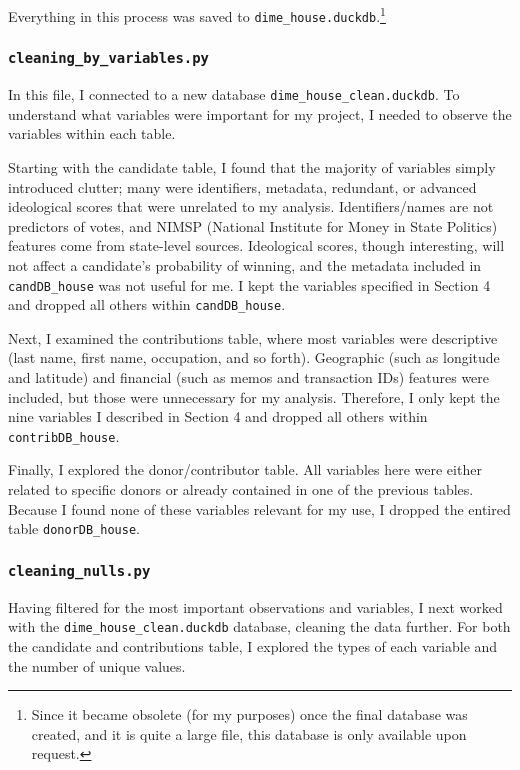Everything in this process was saved to {\tt dime\_house.duckdb}.\footnote{Since it became obsolete (for my purposes) once the final database was created, and it is quite a large file, this database is only available upon request.}

\subsubsection*{\tt cleaning\_by\_variables.py}

In this file, I connected to a new database {\tt dime\_house\_clean.duckdb}. To understand what variables were important for my project, I needed to observe the variables within each table.

Starting with the candidate table, I found that the majority of variables simply introduced clutter; many were identifiers, metadata, redundant, or advanced ideological scores that were unrelated to my analysis. Identifiers/names are not predictors of votes, and NIMSP (National Institute for Money in State Politics) features come from state-level sources. Ideological scores, though interesting, will not affect a candidate's probability of winning, and the metadata included in {\tt candDB\_house} was not useful for me. I kept the variables specified in Section 4 and dropped all others within {\tt candDB\_house}. 

Next, I examined the contributions table, where most variables were descriptive (last name, first name, occupation, and so forth). Geographic (such as longitude and latitude) and financial (such as memos and transaction IDs) features were included, but those were unnecessary for my analysis. Therefore, I only kept the nine variables I described in Section 4 and dropped all others within {\tt contribDB\_house}.

Finally, I explored the donor/contributor table. All variables here were either related to specific donors or already contained in one of the previous tables. Because I found none of these variables relevant for my use, I dropped the entired table {\tt donorDB\_house}.

\subsubsection*{\tt cleaning\_nulls.py}

Having filtered for the most important observations and variables, I next worked with the {\tt dime\_house\_clean.duckdb} database, cleaning the data further. For both the candidate and contributions table, I explored the types of each variable and the number of unique values.

